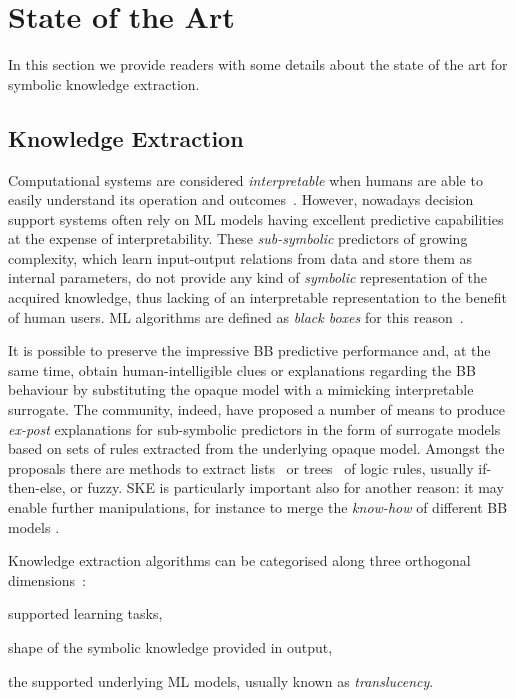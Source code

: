\documentclass[
]{ceurart}
\begin{document}
\section{State of the Art}

In this section we provide readers with some details about the state of the art for symbolic knowledge extraction. %

\subsection{Knowledge Extraction}

Computational systems are considered \emph{interpretable} when humans are able to easily understand its operation and outcomes~\cite{agentbasedxai-aamas2020}.
%
However, nowadays decision support systems often rely on ML models having excellent predictive capabilities at the expense of interpretability.
%
These \emph{sub-symbolic} predictors of growing complexity, which learn input-output relations from data and store them as internal parameters, do not provide any kind of \emph{symbolic} representation of the acquired knowledge, thus lacking of an interpretable representation to the benefit of human users.
%
ML algorithms are defined as \emph{black boxes} for this reason~\cite{Lipton2018}.

It is possible to preserve the impressive BB predictive performance and, at the same time, obtain human-intelligible clues or explanations regarding the BB behaviour by substituting the opaque model with a mimicking interpretable surrogate.
%
The \xai{} community, indeed, have proposed a number of means to produce \emph{ex-post} explanations for sub-symbolic predictors in the form of surrogate models based on sets of rules extracted from the underlying opaque model.
%
Amongst the proposals there are methods to extract lists~\cite{craven1994using,huysmans2006iter,gridex-extraamas2021} or trees~\cite{craven1996extracting,breiman1984classification} of logic rules, usually if-then-else, \mofn{} or fuzzy.
%
SKE is particularly important also for another reason: it may enable further manipulations, for instance to merge the \emph{know-how} of different BB models \cite{xmas-aiiot2019}.

Knowledge extraction algorithms can be categorised along three orthogonal dimensions~\cite{xaisurvey-ia14}:
%
\begin{inlinelist}
    \item\label{item:category:learning-task} supported learning tasks,
    \item\label{item:category:knowledge-form} shape of the symbolic knowledge provided in output,
    \item\label{item:category:translucency} the supported underlying ML models, usually known as \emph{translucency}.
\end{inlinelist}
\end{document}
